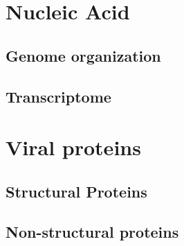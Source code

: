 \section{Nucleic Acid}

\subsection{Genome organization}


\subsection{Transcriptome}

\section{Viral proteins}

\subsection{Structural Proteins}

\subsection{Non-structural proteins}
 


\section{}


\subsection{}



\subsection{}

